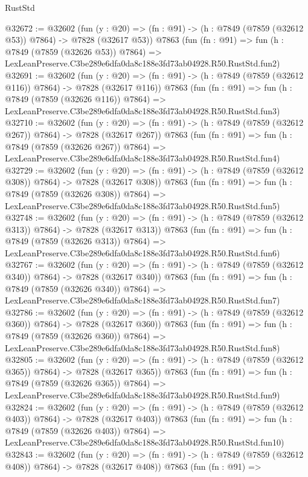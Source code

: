 \begin{lexlean}{RustStd}
\begin{coremodule}
@32672 := @32602
    (fun (y : @20) => (fn : @91) -> (h : @7849 (@7859 (@32612 @53)) @7864) -> @7828 (@32617 @53))
    @7863
    (fun (fn : @91) =>
    fun (h : @7849 (@7859 (@32626 @53)) @7864) =>
    LexLeanPreserve.C3be289e6dfa0da8c188e3fd73ab04928.R50.RustStd.fun2)
@32691 := @32602
    (fun (y : @20) => (fn : @91) -> (h : @7849 (@7859 (@32612 @116)) @7864) -> @7828 (@32617 @116))
    @7863
    (fun (fn : @91) =>
    fun (h : @7849 (@7859 (@32626 @116)) @7864) =>
    LexLeanPreserve.C3be289e6dfa0da8c188e3fd73ab04928.R50.RustStd.fun3)
@32710 := @32602
    (fun (y : @20) => (fn : @91) -> (h : @7849 (@7859 (@32612 @267)) @7864) -> @7828 (@32617 @267))
    @7863
    (fun (fn : @91) =>
    fun (h : @7849 (@7859 (@32626 @267)) @7864) =>
    LexLeanPreserve.C3be289e6dfa0da8c188e3fd73ab04928.R50.RustStd.fun4)
@32729 := @32602
    (fun (y : @20) => (fn : @91) -> (h : @7849 (@7859 (@32612 @308)) @7864) -> @7828 (@32617 @308))
    @7863
    (fun (fn : @91) =>
    fun (h : @7849 (@7859 (@32626 @308)) @7864) =>
    LexLeanPreserve.C3be289e6dfa0da8c188e3fd73ab04928.R50.RustStd.fun5)
@32748 := @32602
    (fun (y : @20) => (fn : @91) -> (h : @7849 (@7859 (@32612 @313)) @7864) -> @7828 (@32617 @313))
    @7863
    (fun (fn : @91) =>
    fun (h : @7849 (@7859 (@32626 @313)) @7864) =>
    LexLeanPreserve.C3be289e6dfa0da8c188e3fd73ab04928.R50.RustStd.fun6)
@32767 := @32602
    (fun (y : @20) => (fn : @91) -> (h : @7849 (@7859 (@32612 @340)) @7864) -> @7828 (@32617 @340))
    @7863
    (fun (fn : @91) =>
    fun (h : @7849 (@7859 (@32626 @340)) @7864) =>
    LexLeanPreserve.C3be289e6dfa0da8c188e3fd73ab04928.R50.RustStd.fun7)
@32786 := @32602
    (fun (y : @20) => (fn : @91) -> (h : @7849 (@7859 (@32612 @360)) @7864) -> @7828 (@32617 @360))
    @7863
    (fun (fn : @91) =>
    fun (h : @7849 (@7859 (@32626 @360)) @7864) =>
    LexLeanPreserve.C3be289e6dfa0da8c188e3fd73ab04928.R50.RustStd.fun8)
@32805 := @32602
    (fun (y : @20) => (fn : @91) -> (h : @7849 (@7859 (@32612 @365)) @7864) -> @7828 (@32617 @365))
    @7863
    (fun (fn : @91) =>
    fun (h : @7849 (@7859 (@32626 @365)) @7864) =>
    LexLeanPreserve.C3be289e6dfa0da8c188e3fd73ab04928.R50.RustStd.fun9)
@32824 := @32602
    (fun (y : @20) => (fn : @91) -> (h : @7849 (@7859 (@32612 @403)) @7864) -> @7828 (@32617 @403))
    @7863
    (fun (fn : @91) =>
    fun (h : @7849 (@7859 (@32626 @403)) @7864) =>
    LexLeanPreserve.C3be289e6dfa0da8c188e3fd73ab04928.R50.RustStd.fun10)
@32843 := @32602
    (fun (y : @20) => (fn : @91) -> (h : @7849 (@7859 (@32612 @408)) @7864) -> @7828 (@32617 @408))
    @7863
    (fun (fn : @91) =>

\end{coremodule}
\end{lexlean}
